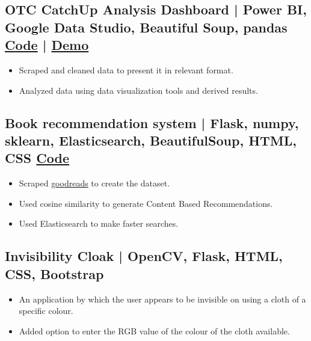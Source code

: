 \documentclass[10pt]{article}
\newenvironment{zitemize}{
\begin{itemize}\itemsep2pt \parskip0pt \parsep1pt}
{\end{itemize}\vspace{-0.5cm}}
\begin{document}


\subsection*{OTC CatchUp Analysis Dashboard | Power BI, Google Data Studio, Beautiful Soup, pandas \hfill \href{https://github.com/mihikagaonkar/OTC-Dashboard/}{Code}
| \href{https://mihikagaonkar.github.io/OTC-Dashboard/data_studio}{Demo}}
    \begin{zitemize}
     \item Scraped and cleaned data to present it in relevant format.
        \item Analyzed data using data visualization tools and derived results.
       
    \end{zitemize}
\subsection*{Book recommendation system | Flask, numpy, sklearn, Elasticsearch, BeautifulSoup, HTML, CSS  \hfill \href{https://github.com/mihikagaonkar/book-recommender-system}{Code}
}
    \begin{zitemize}
     \item Scraped  \href{https://www.goodreads.com/}{goodreads} to create the dataset.
        \item Used cosine similarity to generate Content Based Recommendations.
        \item Used Elasticsearch to make faster searches.
       
    \end{zitemize}
\subsection*{Invisibility Cloak | OpenCV, Flask, HTML, CSS, Bootstrap} 
    \begin{zitemize}
        \item An application by which the user appears to be invisible on using a cloth of a specific colour.
        \item Added option to enter the RGB value of the colour of the cloth available.
    \end{zitemize}
\end{document}

